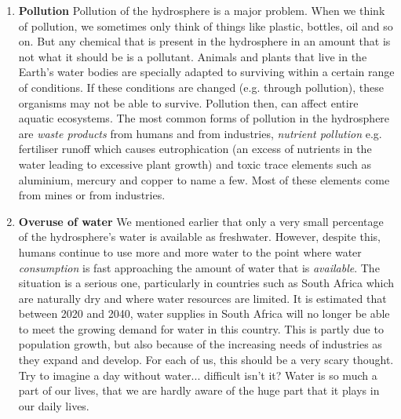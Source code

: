       \label{m38138*id342223}\begin{enumerate}[noitemsep, label=\textbf{\arabic*}. ] 
            \label{m38138*uid91}\item \textbf{Pollution}\newline
Pollution of the hydrosphere is a major problem. When we think of pollution, we sometimes only think of things like plastic, bottles, oil and so on. But any chemical that is present in the hydrosphere in an amount that is not what it should be is a pollutant. Animals and plants that live in the Earth's water bodies are specially adapted to surviving within a certain range of conditions. If these conditions are changed (e.g. through pollution), these organisms may not be able to survive. Pollution then, can affect entire aquatic ecosystems. The most common forms of pollution in the hydrosphere are \textsl{waste products} from humans and from industries, \textsl{nutrient pollution} e.g. fertiliser runoff which causes eutrophication (an excess of nutrients in the water leading to excessive plant growth) and toxic trace elements such as aluminium, mercury and copper to name a few. Most of these elements come from mines or from industries.
\label{m38138*uid87}\item \textbf{Overuse of water}\newline
We mentioned earlier that only a very small percentage of the hydrosphere's water is available as freshwater. However, despite this, humans continue to use more and more water to the point where water \textsl{consumption} is fast approaching the amount of water that is \textsl{available}. The situation is a serious one, particularly in countries such as South Africa which are naturally dry and where water resources are limited. It is estimated that between 2020 and 2040, water supplies in South Africa will no longer be able to meet the growing demand for water in this country. This is partly due to population growth, but also because of the increasing needs of industries as they expand and develop. For each of us, this should be a very scary thought. Try to imagine a day without water... difficult isn't it? Water is so much a part of our lives, that we are hardly aware of the huge part that it plays in our daily lives.
\end{enumerate}
\label{m38138*secfhsst!!!underscore!!!id1046}
